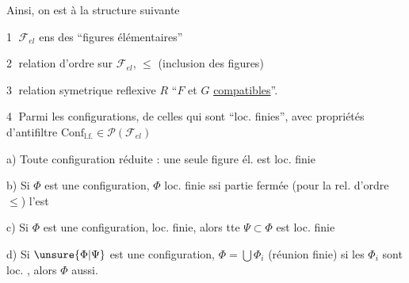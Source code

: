 
Ainsi, on est  à la structure suivante

\textcircled{1} $\mathcal{F}_{el}$ ens des ``figures élémentaires''

\textcircled{2} relation d'ordre sur $\mathcal{F}_{el}$, $\leq$ (inclusion des figures)

\textcircled{3} relation symetrique reflexive $R$  ``$F$ et $G$ \uline{compatibles}''.\  



\textcircled{4}  Parmi les configurations,      de celles qui sont ``loc. finies'', avec  propriétés d'antifiltre \unsure{;|,} $\mathrm{Conf}_{\mathrm{l.f.}}\in\mathcal{P}(\mathcal{F}_{el})$

a) Toute configuration réduite : une seule figure él. est loc. finie


b) Si $\Phi$ est une configuration, $\Phi$ loc. finie ssi   partie fermée (pour la rel. d'ordre $\leq$) l'est

c) Si $\Phi$ est une configuration,  loc. finie, alors tte $\Psi\subset\Phi$ est loc. finie

d) Si $\unsure{\Phi|\Psi}$ est une configuration, $\Phi=\bigcup\Phi_i$ (réunion finie) si les $\Phi_i$ sont loc. , alors $\Phi$ aussi.
